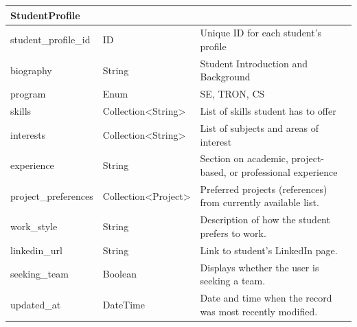 \documentclass[12pt]{article}
\begin{document}
\begin{longtable}{|
      p{}|
      p{}|
      p{}|
  }
      \multicolumn{3}{|l|}{\textbf{StudentProfile}}\\ \hline
      student\_profile\_id & ID & Unique ID for each student's profile \\ \hline
      biography & String & Student Introduction and Background \\ \hline
      program & Enum & SE, TRON, CS \\ \hline
      skills & Collection\textless String\textgreater & List of skills student has to offer \\ \hline
      interests & Collection\textless String\textgreater & List of subjects and areas of interest \\ \hline
      experience & String & Section on academic, project-based, or professional experience \\ \hline
      project\_preferences & Collection\textless Project\textgreater & Preferred projects (references) from currently available list. \\ \hline
      work\_style & String & Description of how the student prefers to work. \\ \hline
      linkedin\_url & String & Link to student's LinkedIn page. \\ \hline
      seeking\_team & Boolean & Displays whether the user is seeking a team. \\ \hline
      updated\_at & DateTime & Date and time when the record was most recently modified. \\ \hline


\end{longtable}
\end{document}
